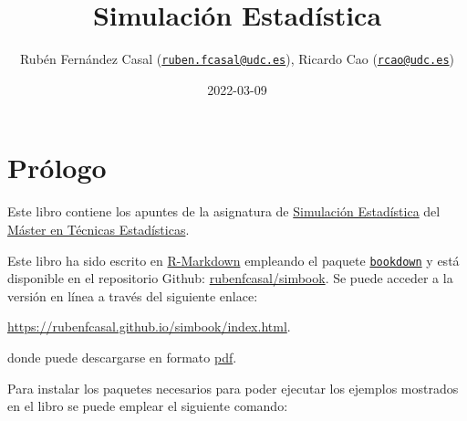 \documentclass[
]{book}
\title{Simulación Estadística}
\author{Rubén Fernández Casal (\href{mailto:ruben.fcasal@udc.es}{\nolinkurl{ruben.fcasal@udc.es}}), Ricardo Cao (\href{mailto:rcao@udc.es}{\nolinkurl{rcao@udc.es}})}
\date{2022-03-09}
\theoremstyle{break}
\theoremstyle{definition}
\theoremstyle{definition}
\theoremstyle{definition}
\theoremstyle{definition}
\theoremstyle{remark}
\begin{document}
\maketitle

{
\setcounter{tocdepth}{1}
\tableofcontents
}
\hypertarget{pruxf3logo}{%
\chapter*{Prólogo}\label{pruxf3logo}}

Este libro contiene los apuntes de la asignatura de \href{http://eamo.usc.es/pub/mte/index.php/es/?option=com_content\&view=article\&id=2201\&idm=13\&a\%C3\%B1o=2019}{Simulación Estadística} del \href{http://eio.usc.es/pub/mte}{Máster en Técnicas Estadísticas}.

Este libro ha sido escrito en \href{http://rmarkdown.rstudio.com}{R-Markdown} empleando el paquete \href{https://bookdown.org/yihui/bookdown/}{\texttt{bookdown}} y está disponible en el repositorio Github: \href{https://github.com/rubenfcasal/simbook}{rubenfcasal/simbook}.
Se puede acceder a la versión en línea a través del siguiente enlace:

\url{https://rubenfcasal.github.io/simbook/index.html}.

donde puede descargarse en formato \href{https://rubenfcasal.github.io/simbook/Simulacion.pdf}{pdf}.

Para instalar los paquetes necesarios para poder ejecutar los ejemplos mostrados en el libro se puede emplear el siguiente comando:
\end{document}
